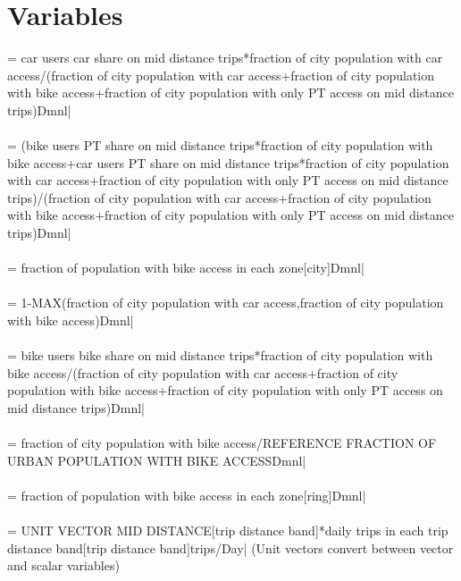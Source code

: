 \section*{Variables}
 = car users car share on mid distance trips*fraction of city population with car access/(fraction of city population with car access+fraction of city population with bike access+fraction of city population with only PT access on mid distance trips)Dmnl| \\ \\ 
 = (bike users PT share on mid distance trips*fraction of city population with bike access+car users PT share on mid distance trips*fraction of city population with car access+fraction of city population with only PT access on mid distance trips)/(fraction of city population with car access+fraction of city population with bike access+fraction of city population with only PT access on mid distance trips)Dmnl| \\ \\ 
 = fraction of population with bike access in each zone[city]Dmnl| \\ \\ 
 = 1-MAX(fraction of city population with car access,fraction of city population with bike access)Dmnl| \\ \\ 
 = bike users bike share on mid distance trips*fraction of city population with bike access/(fraction of city population with car access+fraction of city population with bike access+fraction of city population with only PT access on mid distance trips)Dmnl| \\ \\ 
 = fraction of city population with bike access/REFERENCE FRACTION OF URBAN POPULATION WITH BIKE ACCESSDmnl| \\ \\ 
 = fraction of population with bike access in each zone[ring]Dmnl| \\ \\ 
 = UNIT VECTOR MID DISTANCE[trip distance band]*daily trips in each trip distance band[trip distance band]trips/Day| (Unit vectors convert between vector and scalar variables) \\ \\ 
